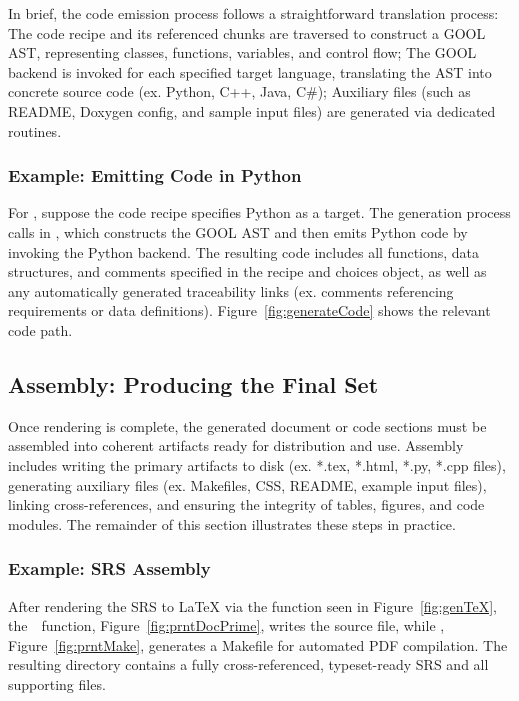 In brief, the code emission process follows a straightforward translation 
process: The code recipe and its referenced chunks are traversed to construct a 
GOOL AST, representing classes, functions, variables, and control flow; The 
GOOL backend is invoked for each specified target language, translating the AST 
into concrete source code (ex. Python, C++, Java, C\#); Auxiliary files (such 
as README, Doxygen config, and sample input files) are generated via dedicated 
routines.

\subsubsection{Example: Emitting \gb{} Code in Python}
For \gb{}, suppose the code recipe specifies Python as a target. The 
generation process calls  in 
, which constructs the GOOL 
AST and then emits Python code by invoking the Python backend. The resulting 
code includes all functions, data structures, and comments specified in the 
recipe and choices object, as well as any automatically generated traceability 
links (ex. comments referencing requirements or data definitions). 
Figure~\ref{fig:generateCode} shows the relevant code path.


\subsection{Assembly: Producing the Final \SF{} Set}
Once rendering is complete, the generated document or code sections must be 
assembled into coherent artifacts ready for distribution and use. Assembly 
includes writing the primary artifacts to disk (ex. *.tex, *.html, *.py, *.cpp 
files), generating auxiliary files (ex. Makefiles, CSS, README, example input 
files), linking cross-references, and ensuring the integrity of tables, 
figures, and code modules. The remainder of this section illustrates these 
steps in practice.

\subsubsection{Example: SRS Assembly}

After rendering the \gb{} SRS to \LaTeX{} via the  function seen 
in Figure~\ref{fig:genTeX}, the~~function, 
Figure~\ref{fig:prntDocPrime}, writes the source file, while , 
Figure~\ref{fig:prntMake}, generates a Makefile for automated PDF compilation. 
The resulting directory contains a fully cross-referenced, typeset-ready SRS 
and all supporting files.

